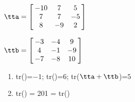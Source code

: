 {$\tta = \left[\hskip -3pt \begin{array}{ccc} -10&7&5\\  7&7&-5
\\  8&-9&2\end{array}\hskip -3pt \right]$
 
$\ttb = \left[\hskip -3pt \begin{array}{ccc} -3&-4&9\\  4&-1&-9
\\  -7&-8&10\end{array}\hskip -3pt \right]$
} 
{\begin{enumerate}
\item tr(\tta)=$-1$; tr(\ttb)=$6$; tr($\tta+\ttb$)=$5$
\item	tr(\tta\ttb) = 201 = tr(\ttb\tta)
\end{enumerate}
}


  

